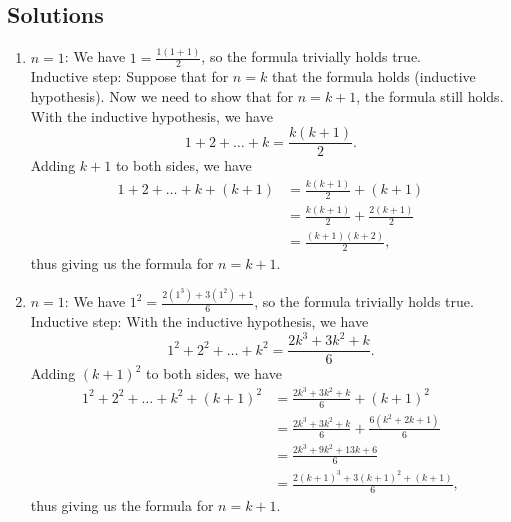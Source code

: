 \documentclass{article}
\begin{document}

\noindent
{}

\subsection*{Solutions}

\begin{enumerate}
\item $n = 1$: We have $1 = \frac{1(1 + 1)}{2}$, so the formula trivially holds true.\\
Inductive step: Suppose that for $n = k$ that the formula holds (inductive hypothesis). Now we need to show that for $n = k + 1$, the formula still holds. With the inductive hypothesis, we have
\begin{equation*}
1 + 2 + \ldots + k = \frac{k(k + 1)}{2}.
\end{equation*}
Adding $k + 1$ to both sides, we have
\begin{equation*}
\begin{split}
1 + 2 + \ldots + k + (k + 1) & = \frac{k(k + 1)}{2} + (k + 1) \\
                             & = \frac{k(k + 1)}{2} + \frac{2(k + 1)}{2} \\
                             & = \frac{(k + 1)(k + 2)}{2},
\end{split}
\end{equation*}
thus giving us the formula for $n = k + 1$.

\item $n = 1$: We have $1^2 = \frac{2(1^3) + 3(1^2) + 1}{6}$, so the formula trivially holds true.\\
Inductive step: With the inductive hypothesis, we have
\begin{equation*}
1^2 + 2^2 + \ldots + k^2 = \frac{2k^3 + 3k^2 + k}{6}.
\end{equation*}
Adding $(k + 1)^2$ to both sides, we have
\begin{equation*}
\begin{split}
1^2 + 2^2 + \ldots + k^2 + (k + 1)^2 & = \frac{2k^3 + 3k^2 + k}{6} + (k + 1)^2 \\
                                     & = \frac{2k^3 + 3k^2 + k}{6} + \frac{6(k^2 + 2k + 1)}{6} \\
                                     & = \frac{2k^3 + 9k^2 + 13k + 6}{6} \\
                                     & = \frac{2(k + 1)^3 + 3(k + 1)^2 + (k + 1)}{6},
\end{split}
\end{equation*}
thus giving us the formula for $n = k + 1$.


\end{enumerate}
\end{document}
